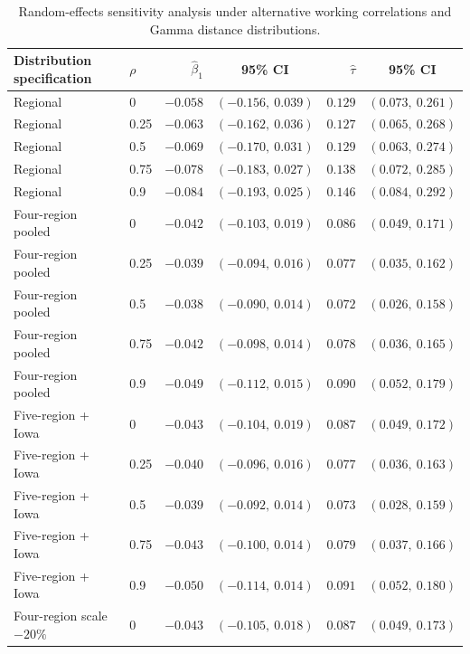 \documentclass[11pt]{article}
\begin{document}
\begin{landscape}
\begin{table}[p]
\centering
\scriptsize
\caption{Random-effects sensitivity analysis under alternative working correlations and Gamma distance distributions.}\label{tab:supp_afo_random_sensitivity}
\begin{tabular}{llrrrr}
\toprule
Distribution specification & $\rho$ & $\hat\beta_1$ & \multicolumn{1}{c}{95\% CI} & $\hat\tau$ & \multicolumn{1}{c}{95\% CI} \\
\midrule
Regional & 0 & $-0.058$ & $(-0.156,\ 0.039)$ & $0.129$ & $(0.073,\ 0.261)$ \\
Regional & 0.25 & $-0.063$ & $(-0.162,\ 0.036)$ & $0.127$ & $(0.065,\ 0.268)$ \\
Regional & 0.5 & $-0.069$ & $(-0.170,\ 0.031)$ & $0.129$ & $(0.063,\ 0.274)$ \\
Regional & 0.75 & $-0.078$ & $(-0.183,\ 0.027)$ & $0.138$ & $(0.072,\ 0.285)$ \\
Regional & 0.9 & $-0.084$ & $(-0.193,\ 0.025)$ & $0.146$ & $(0.084,\ 0.292)$ \\
Four-region pooled & 0 & $-0.042$ & $(-0.103,\ 0.019)$ & $0.086$ & $(0.049,\ 0.171)$ \\
Four-region pooled & 0.25 & $-0.039$ & $(-0.094,\ 0.016)$ & $0.077$ & $(0.035,\ 0.162)$ \\
Four-region pooled & 0.5 & $-0.038$ & $(-0.090,\ 0.014)$ & $0.072$ & $(0.026,\ 0.158)$ \\
Four-region pooled & 0.75 & $-0.042$ & $(-0.098,\ 0.014)$ & $0.078$ & $(0.036,\ 0.165)$ \\
Four-region pooled & 0.9 & $-0.049$ & $(-0.112,\ 0.015)$ & $0.090$ & $(0.052,\ 0.179)$ \\
Five-region + Iowa & 0 & $-0.043$ & $(-0.104,\ 0.019)$ & $0.087$ & $(0.049,\ 0.172)$ \\
Five-region + Iowa & 0.25 & $-0.040$ & $(-0.096,\ 0.016)$ & $0.077$ & $(0.036,\ 0.163)$ \\
Five-region + Iowa & 0.5 & $-0.039$ & $(-0.092,\ 0.014)$ & $0.073$ & $(0.028,\ 0.159)$ \\
Five-region + Iowa & 0.75 & $-0.043$ & $(-0.100,\ 0.014)$ & $0.079$ & $(0.037,\ 0.166)$ \\
Five-region + Iowa & 0.9 & $-0.050$ & $(-0.114,\ 0.014)$ & $0.091$ & $(0.052,\ 0.180)$ \\
Four-region scale $-20\%$ & 0 & $-0.043$ & $(-0.105,\ 0.018)$ & $0.087$ & $(0.049,\ 0.173)$ \\

\end{tabular}
\end{table}
\end{landscape}
\end{document}
